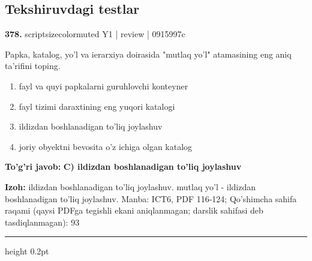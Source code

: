 \documentclass[10pt,a4paper]{article}
\begin{document}
\subsection{Tekshiruvdagi testlar}

{\bfseries\sffamily\color{ink} 378.} {scriptsizecolor{muted} Y1 | review | 0915997c}
\par
Papka, katalog, yo'l va ierarxiya doirasida "mutlaq yo'l" atamasining eng aniq ta'rifini toping.
\begin{enumerate}[label=\Alph*),leftmargin=9mm]
\item fayl va quyi papkalarni guruhlovchi konteyner
\item fayl tizimi daraxtining eng yuqori katalogi
\item ildizdan boshlanadigan to'liq joylashuv
\item joriy obyektni bevosita o'z ichiga olgan katalog
\end{enumerate}
\begin{tcolorbox}[enhanced,breakable,colback=teal!4,colframe=teal!60!black,boxrule=0.45pt,arc=1.2mm,left=2.7mm,right=2.7mm,top=1.8mm,bottom=1.8mm,before skip=2mm,after skip=2mm]
{\bfseries\sffamily\color{teal}To'g'ri javob:} \textbf{C) ildizdan boshlanadigan to'liq joylashuv}
\par\smallskip
{\bfseries Izoh:} ildizdan boshlanadigan to'liq joylashuv. mutlaq yo'l - ildizdan boshlanadigan to'liq joylashuv. Manba: ICT6, PDF 116-124; Qo'shimcha sahifa raqami (qaysi PDFga tegishli ekani aniqlanmagan; darslik sahifasi deb tasdiqlanmagan): 93
\end{tcolorbox}
\vspace{2mm}\hrule height 0.2pt\vspace{3mm}
\end{document}
